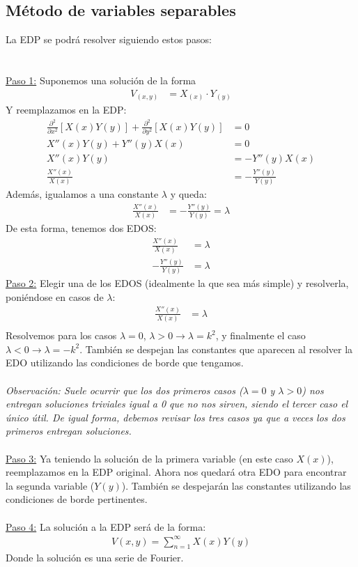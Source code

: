\documentclass[
  11pt,
  letterpaper,
   answers
  ]{exam}
\begin{document}
\subsection*{Método de variables separables}
La EDP se podrá resolver siguiendo estos pasos: \\
\\
\\
\underline{Paso 1:} Suponemos una solución de la forma
\begin{align}
    V_{(x,y)} &= X_{(x)} \cdot Y_{(y)}
\end{align}
Y reemplazamos en la EDP:
\begin{align}
\frac{\partial^2}{\partial x^2}[X(x)Y(y)] + \frac{\partial^2}{\partial y^2}[X(x)Y(y)] &= 0\\
X''(x)Y(y) + Y''(y)X(x) &= 0 \\
X''(x)Y(y) &= - Y''(y)X(x) \\
\frac{X''(x)}{X(x)} &= -\frac{Y''(y)}{Y(y)}
\end{align}
Además, igualamos a una constante $\lambda$ y queda:
\begin{align}
    \frac{X''(x)}{X(x)} &= -\frac{Y''(y)}{Y(y)} = \lambda
\end{align}
De esta forma, tenemos dos EDOS:
\begin{align}
    \frac{X''(x)}{X(x)} &= \lambda \\
    -\frac{Y''(y)}{Y(y)} &= \lambda
\end{align}
\underline{Paso 2:} Elegir una de los EDOS (idealmente la que sea más simple) y resolverla, poniéndose en casos de $\lambda$:
\begin{align}
    \frac{X''(x)}{X(x)} &= \lambda \\
\end{align}
Resolvemos para los casos $\lambda = 0$, $\lambda > 0 \rightarrow \lambda = k^2$, y finalmente el caso $\lambda < 0 \rightarrow \lambda = -k^2$. También se despejan las constantes que aparecen al resolver la EDO utilizando las condiciones de borde que tengamos. 
\\
\\
\textit{Observación: Suele ocurrir que los dos primeros casos ($\lambda = 0$ y $\lambda > 0$) nos entregan soluciones triviales igual a 0 que no nos sirven, siendo el tercer caso el único útil. De igual forma, debemos revisar los tres casos ya que a veces los dos primeros entregan soluciones.}
\\
\\
\underline{Paso 3:} Ya teniendo la solución de la primera variable (en este caso $X(x)$), reemplazamos en la EDP original. Ahora nos quedará otra EDO para encontrar la segunda variable ($Y(y)$). También se despejarán las constantes utilizando las condiciones de borde pertinentes. 
\\
\\
\underline{Paso 4:} La solución a la EDP será de la forma:
\begin{align}
    V(x,y) = \sum_{n=1}^{\infty} X(x) Y(y)
\end{align}
Donde la solución es una serie de Fourier. 
\end{document}
